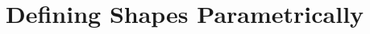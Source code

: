 \documentclass[acmlarge,nonacm=true]{acmart}
\begin{document}
\author{Pang Yu Shao}

\renewcommand{\shortauthors}{Pang Yu Shao}










\tableofcontents
\newpage
\section{Defining Shapes Parametrically}
\end{document}
